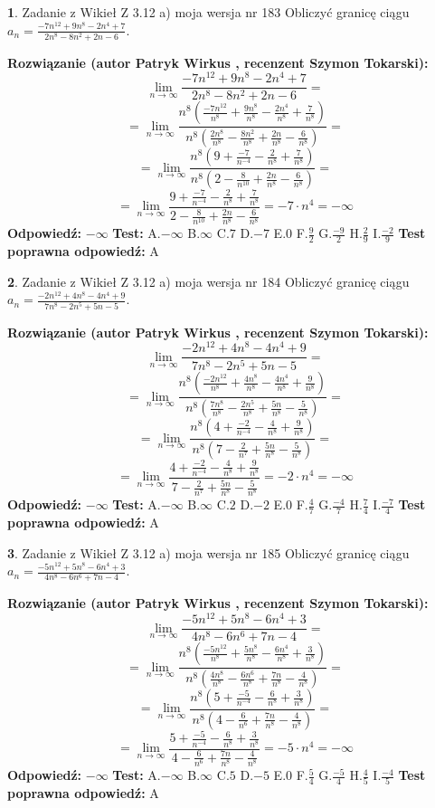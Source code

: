 \documentclass[12pt, a4paper]{article}
\theoremstyle{definition} %
\newtheorem{zad}{}
\newcommand{\zadStart}[1]{\begin{zad}#1\newline}
\newcommand{\zadStop}{\end{zad}}
\newcommand{\rozwStart}[2]{\noindent \textbf{Rozwiązanie (autor #1 , recenzent #2): }\newline}
\newcommand{\rozwStop}{\newline}
\newcommand{\odpStart}{\noindent \textbf{Odpowiedź:}\newline}
\newcommand{\odpStop}{\newline}
\newcommand{\testStart}{\noindent \textbf{Test:}\newline}
\newcommand{\testStop}{\newline}
\newcommand{\kluczStart}{\noindent \textbf{Test poprawna odpowiedź:}\newline}
\newcommand{\kluczStop}{\newline}
\begin{document}
\zadStart{Zadanie z Wikieł Z 3.12 a) moja wersja nr 183}
Obliczyć granicę ciągu $a_{n}=\frac{-7n^{12}+9n^{8}-2n^{4}+7}{2n^{8}-8n^{2}+2n-6}$.
\zadStop
\rozwStart{Patryk Wirkus}{Szymon Tokarski}
$$\lim\limits_{n\to\infty}\frac{-7n^{12}+9n^{8}-2n^{4}+7}{2n^{8}-8n^{2}+2n-6}=$$
$$=\lim\limits_{n\to\infty}\frac{n^{8}\left(\frac{-7n^{12}}{n^{8}}+\frac{9n^{8}}{n^{8}}-\frac{2n^{4}}{n^{8}}+\frac{7}{n^{8}}\right)}{n^{8}\left(\frac{2n^{8}}{n^{8}}-\frac{8n^{2}}{n^{8}}+\frac{2n}{n^{8}}-\frac{6}{n^{8}}\right)}=$$
$$=\lim\limits_{n\to\infty}\frac{n^{8}\left(9+\frac{-7}{n^{-4}}-\frac{2}{n^{8}}+\frac{7}{n^{8}}\right)}
{n^{8}\left(2-\frac{8}{n^{10}}+\frac{2n}{n^{8}}-\frac{6}{n^{8}}\right)}=$$
$$=\lim\limits_{n\to\infty}\frac{9+\frac{-7}{n^{-4}}-\frac{2}{n^{8}}+\frac{7}{n^{8}}}{2-\frac{8}{n^{10}}+\frac{2n}{n^{8}}-\frac{6}{n^{8}}}=-7\cdot n^{4} = -\infty$$
\rozwStop
\odpStart
$-\infty$
\odpStop
\testStart
A.$-\infty$
B.$\infty$
C.$7$
D.$-7$
E.$0$
F.$\frac{9}{2}$
G.$\frac{-9}{2}$
H.$\frac{2}{9}$
I.$\frac{-2}{9}$
\testStop
\kluczStart
A
\kluczStop



\zadStart{Zadanie z Wikieł Z 3.12 a) moja wersja nr 184}
Obliczyć granicę ciągu $a_{n}=\frac{-2n^{12}+4n^{8}-4n^{4}+9}{7n^{8}-2n^{5}+5n-5}$.
\zadStop
\rozwStart{Patryk Wirkus}{Szymon Tokarski}
$$\lim\limits_{n\to\infty}\frac{-2n^{12}+4n^{8}-4n^{4}+9}{7n^{8}-2n^{5}+5n-5}=$$
$$=\lim\limits_{n\to\infty}\frac{n^{8}\left(\frac{-2n^{12}}{n^{8}}+\frac{4n^{8}}{n^{8}}-\frac{4n^{4}}{n^{8}}+\frac{9}{n^{8}}\right)}{n^{8}\left(\frac{7n^{8}}{n^{8}}-\frac{2n^{5}}{n^{8}}+\frac{5n}{n^{8}}-\frac{5}{n^{8}}\right)}=$$
$$=\lim\limits_{n\to\infty}\frac{n^{8}\left(4+\frac{-2}{n^{-4}}-\frac{4}{n^{8}}+\frac{9}{n^{8}}\right)}
{n^{8}\left(7-\frac{2}{n^{7}}+\frac{5n}{n^{8}}-\frac{5}{n^{8}}\right)}=$$
$$=\lim\limits_{n\to\infty}\frac{4+\frac{-2}{n^{-4}}-\frac{4}{n^{8}}+\frac{9}{n^{8}}}{7-\frac{2}{n^{7}}+\frac{5n}{n^{8}}-\frac{5}{n^{8}}}=-2\cdot n^{4} = -\infty$$
\rozwStop
\odpStart
$-\infty$
\odpStop
\testStart
A.$-\infty$
B.$\infty$
C.$2$
D.$-2$
E.$0$
F.$\frac{4}{7}$
G.$\frac{-4}{7}$
H.$\frac{7}{4}$
I.$\frac{-7}{4}$
\testStop
\kluczStart
A
\kluczStop



\zadStart{Zadanie z Wikieł Z 3.12 a) moja wersja nr 185}
Obliczyć granicę ciągu $a_{n}=\frac{-5n^{12}+5n^{8}-6n^{4}+3}{4n^{8}-6n^{6}+7n-4}$.
\zadStop
\rozwStart{Patryk Wirkus}{Szymon Tokarski}
$$\lim\limits_{n\to\infty}\frac{-5n^{12}+5n^{8}-6n^{4}+3}{4n^{8}-6n^{6}+7n-4}=$$
$$=\lim\limits_{n\to\infty}\frac{n^{8}\left(\frac{-5n^{12}}{n^{8}}+\frac{5n^{8}}{n^{8}}-\frac{6n^{4}}{n^{8}}+\frac{3}{n^{8}}\right)}{n^{8}\left(\frac{4n^{8}}{n^{8}}-\frac{6n^{6}}{n^{8}}+\frac{7n}{n^{8}}-\frac{4}{n^{8}}\right)}=$$
$$=\lim\limits_{n\to\infty}\frac{n^{8}\left(5+\frac{-5}{n^{-4}}-\frac{6}{n^{8}}+\frac{3}{n^{8}}\right)}
{n^{8}\left(4-\frac{6}{n^{6}}+\frac{7n}{n^{8}}-\frac{4}{n^{8}}\right)}=$$
$$=\lim\limits_{n\to\infty}\frac{5+\frac{-5}{n^{-4}}-\frac{6}{n^{8}}+\frac{3}{n^{8}}}{4-\frac{6}{n^{6}}+\frac{7n}{n^{8}}-\frac{4}{n^{8}}}=-5\cdot n^{4} = -\infty$$
\rozwStop
\odpStart
$-\infty$
\odpStop
\testStart
A.$-\infty$
B.$\infty$
C.$5$
D.$-5$
E.$0$
F.$\frac{5}{4}$
G.$\frac{-5}{4}$
H.$\frac{4}{5}$
I.$\frac{-4}{5}$
\testStop
\kluczStart
A
\kluczStop
\end{document}
